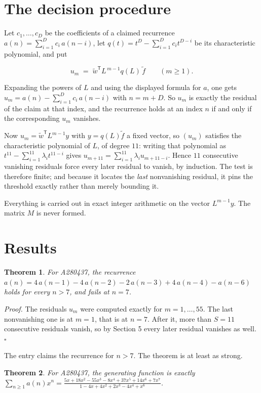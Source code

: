 \documentclass[11pt]{article}
\newtheorem{theorem}{Theorem}
\theoremstyle{definition}
\begin{document}
\section{The decision procedure}

Let $c_1,\dots,c_D$ be the coefficients of a claimed recurrence $a(n) = \sum_{i=1}^{D} c_i\,a(n-i)$, let $q(t) = t^{D} - \sum_{i=1}^{D} c_i t^{D-i}$ be its characteristic polynomial, and put

\[u_m \;=\; \tilde w^{\mathsf T} L^{\,m-1} q(L)\,\tilde f \qquad (m \ge 1).\]

Expanding the powers of $L$ and using the displayed formula for $a$, one gets $u_m = a(n) - \sum_{i=1}^{D} c_i\,a(n-i)$ with $n = m + D$. So $u_m$ is exactly the residual of the claim at that index, and the recurrence holds at an index $n$ if and only if the corresponding $u_m$ vanishes.

Now $u_m = \tilde w^{\mathsf T} L^{m-1} y$ with $y = q(L)\tilde f$ a fixed vector, so $(u_m)$ satisfies the characteristic polynomial of $L$, of degree $11$: writing that polynomial as $t^{11} - \sum_{i=1}^{11} \lambda_i t^{11-i}$ gives $u_{m+11} = \sum_{i=1}^{11} \lambda_i u_{m+11-i}$. Hence $11$ consecutive vanishing residuals force every later residual to vanish, by induction. The test is therefore finite; and because it locates the {\itshape last} nonvanishing residual, it pins the threshold exactly rather than merely bounding it.

Everything is carried out in exact integer arithmetic on the vector $L^{m-1}y$. The matrix $M$ is never formed.

\section{Results}

\begin{theorem} For A280437, the recurrence $a(n) = 4\,a(n-1) - 4\,a(n-2) - 2\,a(n-3) + 4\,a(n-4) - a(n-6)$ holds for every $n > 7$, and fails at $n = 7$.\end{theorem}

{\itshape Proof.} The residuals $u_m$ were computed exactly for $m = 1,\dots,55$. The last nonvanishing one is at $m = 1$, that is at $n = 7$. After it, more than $S = 11$ consecutive residuals vanish, so by Section 5 every later residual vanishes as well. $\square$

The entry claims the recurrence for $n > 7$. The theorem is at least as strong.

\begin{theorem} For A280437, the generating function is exactly $\sum_{n\ge 1} a(n)x^n = \frac{5x + 18x^{2} - 55x^{3} - 8x^{4} + 37x^{5} + 14x^{6} + 7x^{7}}{1 - 4x + 4x^{2} + 2x^{3} - 4x^{4} + x^{6}}$.\end{theorem}
\end{document}
